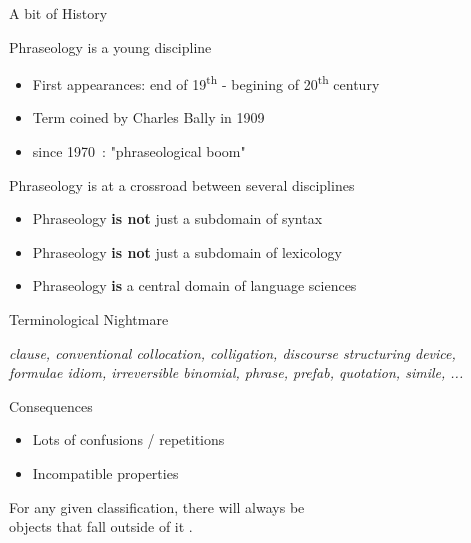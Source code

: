 \documentclass[serif, aspectratio=169]{beamer}
\begin{document}
\begin{frame}{A bit of History}
    \pause
    \begin{block}{Phraseology is a young discipline}
        \begin{itemize}
            \item First appearances: end of 19\textsuperscript{th} - begining of 20\textsuperscript{th} century
            \item Term coined by Charles Bally in 1909
            \item since 1970~: "phraseological boom" \citep{granger_phraseology_2008} %
        \end{itemize}
    \end{block}
    \vfill
    \pause
    \begin{block}{Phraseology is at a crossroad between several disciplines}
        \begin{itemize}
            \item Phraseology \textbf{is not} just a subdomain of syntax
            \item Phraseology \textbf{is not} just a subdomain of lexicology
            \item Phraseology \textbf{is} a central domain of language sciences \citep{dostie_phraseologie_2025} %
        \end{itemize}
    \end{block}
\end{frame}

\begin{frame}{Terminological Nightmare}
    \begin{block}{}
    \textit{clause, conventional collocation, colligation, discourse structuring device, formulae idiom, irreversible binomial, phrase, prefab, quotation, simile, ...}
    \end{block}
    \vfill
    \pause
    \begin{block}{Consequences}
        \begin{itemize}
            \item Lots of confusions / repetitions
            \item Incompatible properties \citep{gross_les_1996} %
        \end{itemize}
    \end{block}
    \vfill
    \pause
    \begin{center}
        \Large
        For any given classification, there will always be \\ objects that fall outside of it \citep{heinz_les_1993}. %
    \end{center}
\end{frame}
\end{document}
